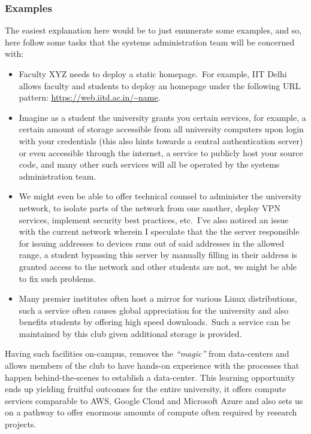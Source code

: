 \documentclass[11pt,twocolumn,oneside]{book}
\begin{document}
    \subsubsection{Examples}
    The easiest explanation here would be to just enumerate some examples, and so, here follow some tasks that the
    systems administration team will be concerned with:

    \begin{itemize}
        \item Faculty XYZ needs to deploy a static homepage.\ For example, IIT Delhi allows faculty and students to
        deploy an homepage under the following URL pattern:
        \href{https://web.iitd.ac.in/~name}{\color{blue}\underline{\url{https://web.iitd.ac.in/~name}}}.
        \item Imagine as a student the university grants you certain services, for example, a certain amount of storage
        accessible from all university computers upon login with your credentials (this also hints towards a central
        authentication server) or even accessible through the internet, a service to publicly host your source code,
        and many other such services will all be operated by the systems administration team.
        \item We might even be able to offer technical counsel to administer the university network, to isolate parts of
        the network from one another, deploy VPN services, implement security best practices, etc.\ I've also noticed an
        issue with the current network wherein I speculate that the the server responsible for issuing addresses to
        devices runs out of said addresses in the allowed range, a student bypassing this server by manually filling in
        their address is granted access to the network and other students are not, we might be able to fix such
        problems.
        \item Many premier institutes often host a mirror for various Linux distributions, such a service often causes
        global appreciation for the university and also benefits students by offering high speed downloads.\ Such a
        service can be maintained by this club given additional storage is provided.
    \end{itemize}

    Having such facilities on-campus, removes the \emph{``magic''} from data-centers and allows members of the
    club to have hands-on experience with the processes that happen behind-the-scenes to establish a data-center.
    This learning opportunity ends up yielding fruitful outcomes for the entire university, it offers compute
    services comparable to AWS, Google Cloud and Microsoft Azure and also sets us on a pathway to offer enormous
    amounts of compute often required by research projects.

\end{document}
